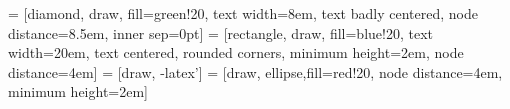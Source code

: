 \documentclass[en]{aghdpl}  %
\author{Krzysztof Szczęsny, Jan Twardowski}
\date{2017}
\begin{document}
\titlepages

{
	\fancyhf{}
	\renewcommand{\headrulewidth}{0pt}
	\renewcommand{\footrulewidth}{0pt}
}

\setcounter{tocdepth}{2}
\tableofcontents
\clearpage

 = [diamond, draw, fill=green!20, 
text width=8em, text badly centered, node distance=8.5em, inner sep=0pt]
 = [rectangle, draw, fill=blue!20, 
text width=20em, text centered, rounded corners, minimum height=2em, node distance=4em]
 = [draw, -latex']
 = [draw, ellipse,fill=red!20, node distance=4em,
minimum height=2em]




%
%


\printbibliography


% 
% 
\end{document}
